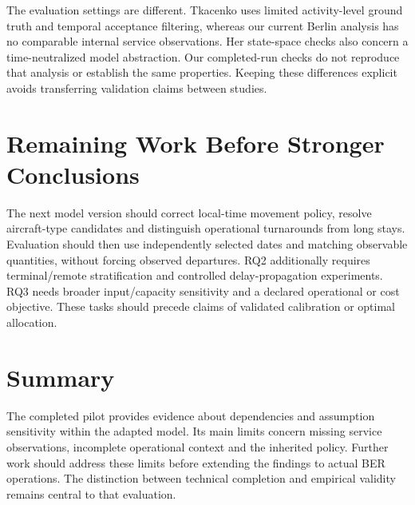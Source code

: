 The evaluation settings are different. Tkacenko uses limited activity-level ground truth and temporal acceptance filtering, whereas our current Berlin analysis has no comparable internal service observations. Her state-space checks also concern a time-neutralized model abstraction. Our completed-run checks do not reproduce that analysis or establish the same properties. Keeping these differences explicit avoids transferring validation claims between studies.

\section{Remaining Work Before Stronger Conclusions}
The next model version should correct local-time movement policy, resolve aircraft-type candidates and distinguish operational turnarounds from long stays. Evaluation should then use independently selected dates and matching observable quantities, without forcing observed departures. RQ2 additionally requires terminal/remote stratification and controlled delay-propagation experiments. RQ3 needs broader input/capacity sensitivity and a declared operational or cost objective. These tasks should precede claims of validated calibration or optimal allocation.


\section{Summary}
The completed pilot provides evidence about dependencies and assumption sensitivity within the adapted model. Its main limits concern missing service observations, incomplete operational context and the inherited policy. Further work should address these limits before extending the findings to actual BER operations. The distinction between technical completion and empirical validity remains central to that evaluation.
